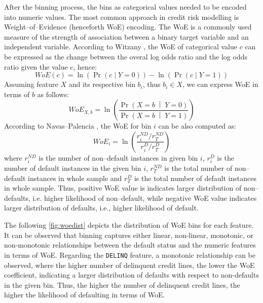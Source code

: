 After the binning process, the bins as categorical values needed to be encoded into numeric values. The most common approach in credit risk modelling is Weight--of--Evidence (henceforth WoE) encoding. The WoE is a commonly used measure of the strength of association between a binary target variable and an independent variable.
According to Witzany \citep{witzany2017credit}, the WoE of categorical value $c$ can be expressed as the change between the overal log odds ratio and the log odds ratio given the value $c$, hence:
\begin{equation}\label{eq}
    WoE\left(c\right) = \ln\left(\operatorname{Pr}\left(c \mid Y = 0 \right) \right) - \ln\left(\operatorname{Pr}\left(c \mid Y = 1 \right) \right)
\end{equation}
Assuming feature $X$ and its respective bin $b_i$, thus $b_i \in X$, we can express WoE in terms of $b$ as follows:
\begin{equation}\label{eq}
    WoE_{X, b}= \ln \left(\frac{\Pr{\left(X = b\;\middle|\;Y = 0\right)}}{\Pr{\left(X = b\;\middle|\;Y = 1\right)}}\right)
\end{equation}
According to Navas--Palencia \citep{navas2020optimal}, the WoE for bin $i$ can be also computed as:
\begin{equation}\label{eq}
    WoE_{i} = \ln \left( \frac{r^{ND}_i / r^{ND}_T} {r^{D}_i / r^{D}_T}  \right)
\end{equation}
where $r^{ND}_i$ is the number of non--default instances in given bin $i$, $r^{D}_i$ is the number of default instances in the given bin $i$, $r^{ND}_T$ is the total number of non--default instances in whole sample and $r^{D}_T$ is the total number of default instances in whole sample.
Thus, positive WoE value is indicates larger distribution of non--defaults, i.e. higher likelihood of non--default, while negative WoE value indicates larger distribution of defaults, i.e., higher likelihood of default. 

The following \autoref{fig:woedist} depicts the distribution of WoE bins for each feature. It can be observed that binning captures either linear, non-linear, monotonic, or non-monotonic relationships between the default status and the numeric features in terms of WoE.
Regarding the \texttt{DELINQ} feature, a monotonic relationship can be observed, where the higher number of delinquent credit lines, the lower the WoE coefficient, indicating a larger distribution of defaults with respect to non-defaults in the given bin.
Thus, the higher the number of delinquent credit lines, the higher the likelihood of defaulting in terms of WoE.

